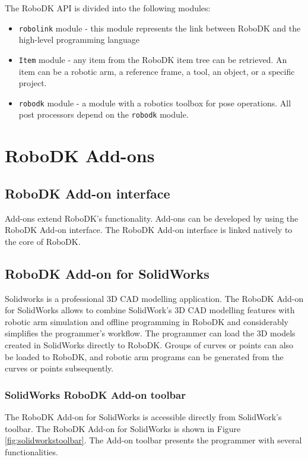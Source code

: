 The RoboDK API is divided into the following modules:


\begin{itemize}
    \item \texttt{robolink} module - this module represents the link between RoboDK and the high-level programming language
    \item \texttt{Item} module - any item from the RoboDK item tree can be retrieved.  An item can be a robotic arm, a reference frame, a tool, an object, or a specific project.
    \item \texttt{robodk} module - a module with a robotics toolbox for pose operations. All post processors depend on the \texttt{robodk} module.
\end{itemize}

\section{RoboDK Add-ons}

\subsection{RoboDK Add-on interface}

Add-ons extend RoboDK's functionality. Add-ons can be developed by using the RoboDK Add-on interface. The RoboDK Add-on interface is linked natively to the core of RoboDK.

\subsection{RoboDK Add-on for SolidWorks}

Solidworks is a professional 3D CAD modelling application. The RoboDK Add-on for SolidWorks allows to combine SolidWork's 3D CAD modelling features with robotic arm simulation and offline programming in RoboDK and considerably simplifies the programmer's workflow. The programmer can load the 3D models created in SolidWorks directly to RoboDK. Groups of curves or points can also be loaded to RoboDK, and robotic arm programs can be generated from the curves or points subsequently.

\subsubsection*{SolidWorks RoboDK Add-on toolbar}

The RoboDK Add-on for SolidWorks is accessible directly from SolidWork's toolbar.  The RoboDK Add-on for SolidWorks is shown in Figure  \ref{fig:solidworkstoolbar}. The Add-on toolbar presents the programmer with several functionalities.

